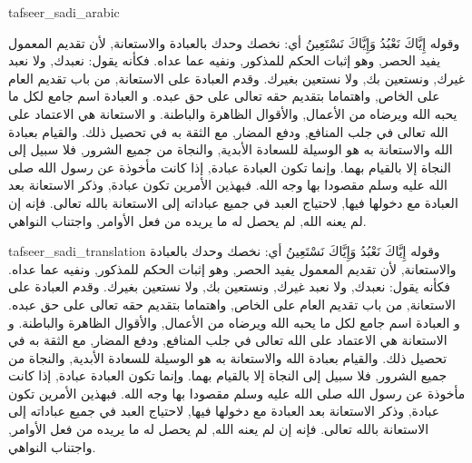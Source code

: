\begin{taggedblock}{tafseer_sadi_arabic}
\begin{Arabic}
وقوله
{ إِيَّاكَ نَعْبُدُ وَإِيَّاكَ نَسْتَعِينُ }
أي: نخصك وحدك بالعبادة والاستعانة, لأن تقديم المعمول يفيد الحصر, وهو إثبات الحكم للمذكور, ونفيه عما عداه. فكأنه يقول: نعبدك, ولا نعبد غيرك, ونستعين بك, ولا نستعين بغيرك. وقدم العبادة على الاستعانة, من باب تقديم العام على الخاص, واهتماما بتقديم حقه تعالى على حق عبده. و
{ العبادة }
اسم جامع لكل ما يحبه الله ويرضاه من الأعمال, والأقوال الظاهرة والباطنة. و
{ الاستعانة }
هي الاعتماد على الله تعالى في جلب المنافع, ودفع المضار, مع الثقة به في تحصيل ذلك. والقيام بعبادة الله والاستعانة به هو الوسيلة للسعادة الأبدية, والنجاة من جميع الشرور, فلا سبيل إلى النجاة إلا بالقيام بهما. وإنما تكون العبادة عبادة, إذا كانت مأخوذة عن رسول الله صلى الله عليه وسلم مقصودا بها وجه الله. فبهذين الأمرين تكون عبادة, وذكر
{ الاستعانة }
بعد
{ العبادة }
مع دخولها فيها, لاحتياج العبد في جميع عباداته إلى الاستعانة بالله تعالى. فإنه إن لم يعنه الله, لم يحصل له ما يريده من فعل الأوامر, واجتناب النواهي.
\end{Arabic}
\end{taggedblock}
\begin{taggedblock}{tafseer_sadi_translation}
وقوله
{ إِيَّاكَ نَعْبُدُ وَإِيَّاكَ نَسْتَعِينُ }
أي: نخصك وحدك بالعبادة والاستعانة, لأن تقديم المعمول يفيد الحصر, وهو إثبات الحكم للمذكور, ونفيه عما عداه. فكأنه يقول: نعبدك, ولا نعبد غيرك, ونستعين بك, ولا نستعين بغيرك. وقدم العبادة على الاستعانة, من باب تقديم العام على الخاص, واهتماما بتقديم حقه تعالى على حق عبده. و
{ العبادة }
اسم جامع لكل ما يحبه الله ويرضاه من الأعمال, والأقوال الظاهرة والباطنة. و
{ الاستعانة }
هي الاعتماد على الله تعالى في جلب المنافع, ودفع المضار, مع الثقة به في تحصيل ذلك. والقيام بعبادة الله والاستعانة به هو الوسيلة للسعادة الأبدية, والنجاة من جميع الشرور, فلا سبيل إلى النجاة إلا بالقيام بهما. وإنما تكون العبادة عبادة, إذا كانت مأخوذة عن رسول الله صلى الله عليه وسلم مقصودا بها وجه الله. فبهذين الأمرين تكون عبادة, وذكر
{ الاستعانة }
بعد
{ العبادة }
مع دخولها فيها, لاحتياج العبد في جميع عباداته إلى الاستعانة بالله تعالى. فإنه إن لم يعنه الله, لم يحصل له ما يريده من فعل الأوامر, واجتناب النواهي.
\end{taggedblock}

\begin{comment}
Please use the following for footnotes:- Sample\footnoteQ{Text of Qur'an footnote goes here.}.
Sample\footnoteT{Text of Tafseer footnote goes here.}.
\end{comment}